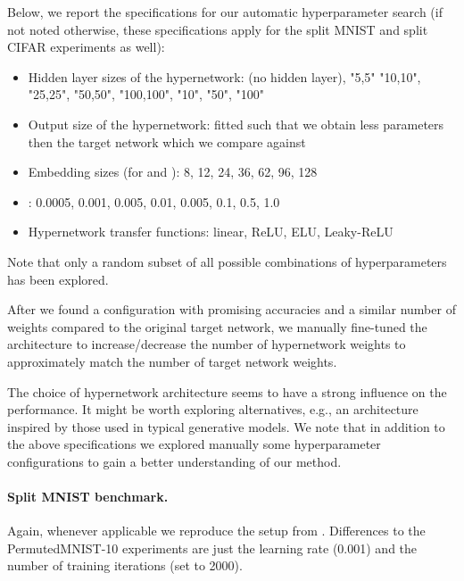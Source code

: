 \documentclass{article}
\begin{document}
Below, we report the specifications for our automatic hyperparameter search (if not noted otherwise, these specifications apply for the split MNIST and split CIFAR experiments as well):
\begin{itemize}
    \item Hidden layer sizes of the hypernetwork: (no hidden layer), "5,5" "10,10", "25,25", "50,50", "100,100", "10", "50", "100"
    \item Output size of the hypernetwork: fitted such that we obtain less parameters then the target network which we compare against
    \item Embedding sizes (for  and ): 8, 12, 24, 36, 62, 96, 128
    \item : 0.0005, 0.001, 0.005, 0.01, 0.005, 0.1, 0.5, 1.0
     \item Hypernetwork transfer functions: linear, ReLU, ELU, Leaky-ReLU
\end{itemize}

Note that only a random subset of all possible combinations of hyperparameters has been explored.

After we found a configuration with promising accuracies and a similar number of weights compared to the original target network, we manually fine-tuned the architecture to increase/decrease the number of hypernetwork weights to approximately match the number of target network weights.

The choice of hypernetwork architecture seems to have a strong influence on the performance. It might be worth exploring alternatives, e.g., an architecture inspired by those used in typical generative models. We note that in addition to the above specifications we explored manually some hyperparameter configurations to gain a better understanding of our method.

\paragraph{Split MNIST benchmark.}

Again, whenever applicable we reproduce the setup from \citet{van_de_ven_three_2019}. Differences to the PermutedMNIST-10 experiments are just the learning rate (0.001) and the number of training iterations (set to 2000).
\end{document}
